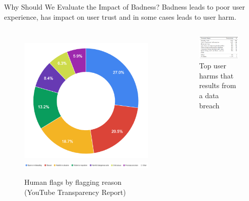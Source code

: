 \documentclass[nobackground,dvipsnames,table]{beamer}
\begin{document}
\begin{frame}{Why Should We Evaluate the Impact of Badness?}
    Badness leads to poor user experience, has impact on user trust and in some cases leads to user harm.
    \begin{columns}
            \begin{figure}
                \centering
                \caption{Human flags by flagging reason (YouTube Transparency Report)}
                \includegraphics[width=\textwidth]{youtube-reports}
                \includegraphics[width=1.5\textwidth]{youtube-reports-key}
            \end{figure}
            \begin{figure}
                \centering
                \caption{Top user harms that results from a data breach}
                \includegraphics[width=\textwidth]{potential-harms}
            \end{figure}
    \end{columns}
\end{frame}
\end{document}
